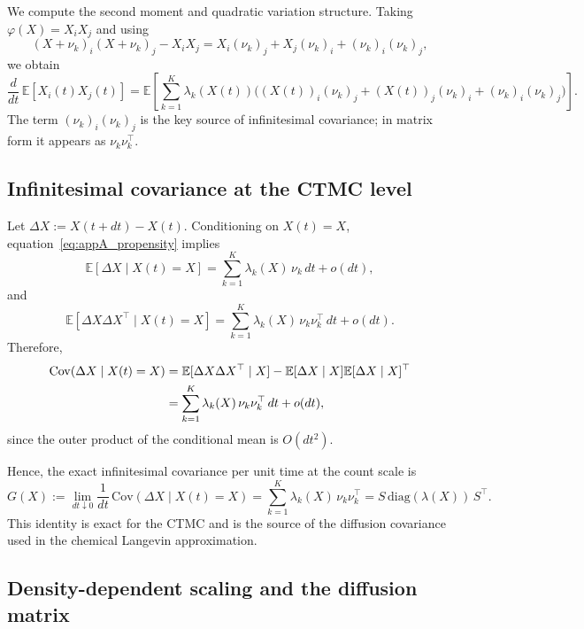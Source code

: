 \documentclass[pdflatex,sn-mathphys-ay]{sn-jnl}
\theoremstyle{thmstyleone}
\theoremstyle{definition}
\theoremstyle{remark}
\begin{document}
\begin{appendices}
We compute the second moment and quadratic variation structure.
Taking \(\varphi(X)=X_iX_j\) and using
\[
(X+\nu_k)_i(X+\nu_k)_j-X_iX_j
=
X_i(\nu_k)_j+X_j(\nu_k)_i+(\nu_k)_i(\nu_k)_j,
\]
we obtain
\begin{equation}\label{eq:appA_second_moment_raw}
\frac{d}{dt}\,\mathbb E[X_i(t)X_j(t)]
=
\mathbb E\!\left[
\sum_{k=1}^K \lambda_k(X(t))
\Big(
(X(t))_i(\nu_k)_j+(X(t))_j(\nu_k)_i+(\nu_k)_i(\nu_k)_j
\Big)
\right].
\end{equation}
The term \((\nu_k)_i(\nu_k)_j\) is the key source of infinitesimal covariance; in matrix form it appears as \(\nu_k\nu_k^\top\).

\subsection{Infinitesimal covariance at the CTMC level}
\label{app:CME_inf_cov}

Let \(\Delta X := X(t+dt)-X(t)\). Conditioning on \(X(t)=X\), equation~\eqref{eq:appA_propensity} implies
\[
\mathbb E[\Delta X\mid X(t)=X]
=
\sum_{k=1}^K \lambda_k(X)\,\nu_k\,dt + o(dt),
\]
and
\[
\mathbb E[\Delta X\Delta X^\top\mid X(t)=X]
=
\sum_{k=1}^K \lambda_k(X)\,\nu_k\nu_k^\top\,dt + o(dt).
\]
Therefore,
\begin{align}
\mathrm{Cov}(\Delta X\mid X(t)=X)
&=
\mathbb E[\Delta X\Delta X^\top\mid X]
-
\mathbb E[\Delta X\mid X]\mathbb E[\Delta X\mid X]^\top \notag\\
&=
\sum_{k=1}^K \lambda_k(X)\,\nu_k\nu_k^\top\,dt + o(dt), \label{eq:appA_cov_short_time}
\end{align}
since the outer product of the conditional mean is \(O(dt^2)\).

Hence, the exact infinitesimal covariance per unit time at the count scale is
\begin{equation}\label{eq:appA_inf_cov_counts}
G(X)
:=
\lim_{dt\downarrow 0}\frac{1}{dt}\,\mathrm{Cov}(\Delta X\mid X(t)=X)
=
\sum_{k=1}^K \lambda_k(X)\,\nu_k\nu_k^\top
=
S\,\mathrm{diag}(\lambda(X))\,S^\top.
\end{equation}
This identity is exact for the CTMC and is the source of the diffusion covariance used in the chemical Langevin approximation.

\subsection{Density-dependent scaling and the diffusion matrix}
\label{app:KM_FP}


\end{appendices}
\end{document}

